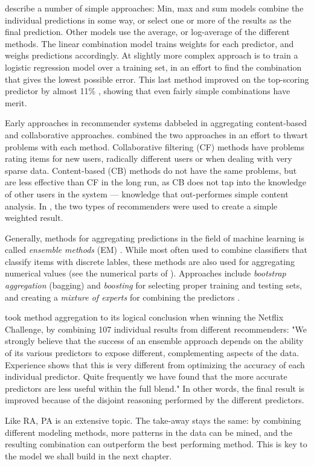 \cite{Aslam2001} describe a number of simple approaches:
Min, max and sum models combine the individual predictions in some way, 
or select one or more of the results as the final prediction. 
Other models use the average, or log-average of the different methods.
The linear combination model trains weights for each predictor, and weighs predictions accordingly.
At slightly more complex approach is to train a logistic regression model \cite[p3]{Aslam2001}
over a training set, in an effort to find the combination that gives the lowest possible error.
This last method improved on the top-scoring predictor by almost 11\% \cite[p3]{Aslam2001},
showing that even fairly simple combinations have merit.

Early approaches in recommender systems dabbeled in aggregating content-based and collaborative approaches.
\cite{Claypool1999} combined the two approaches in an effort to thwart problems with each method.
Collaborative filtering (CF) methods have problems rating items for new users, radically different users or when dealing with very sparse data.
Content-based (CB) methods do not have the same problems, but are less effective than CF in the long run, as CB does not tap into the 
knowledge of other users in the system --- knowledge that out-performes simple content analysis.
In \cite{Claypool1999}, the two types of recommenders were used to create a simple weighted result.

Generally, methods for aggregating predictions in the field of machine learning is called \emph{ensemble methods} (EM) \cite[p1]{Dietterich2000}.
While most often used to combine classifiers that classify items with discrete lables,
these methods are also used for aggregating numerical values (see the numerical parts of \cite{Breiman1996}).
Approaches include \emph{bootstrap aggregation} (bagging) and \emph{boosting} 
for selecting proper training and testing sets,
and creating a \emph{mixture of experts} for combining the predictors
\cite[p27]{Polikar2006}.


\cite{Bell2007} took method aggregation to its logical conclusion when winning the Netflix Challenge,
by combining 107 individual results from different recommenders: 
"We strongly believe that the success of an ensemble approach depends on the ability of its various predictors to expose different, 
complementing aspects of the data. Experience shows that this is very different from optimizing the accuracy of each individual predictor. 
Quite frequently we have found that the more accurate predictors are less useful within the full blend." \cite[p6]{Bell2007}
In other words, the final result is improved because of the disjoint reasoning performed by the different predictors.

Like RA, PA is an extensive topic.
The take-away stays the same: by combining different modeling methods,
more patterns in the data can be mined, and 
the resulting combination can outperform the best performing method.
This is key to the model we shall build in the next chapter.


